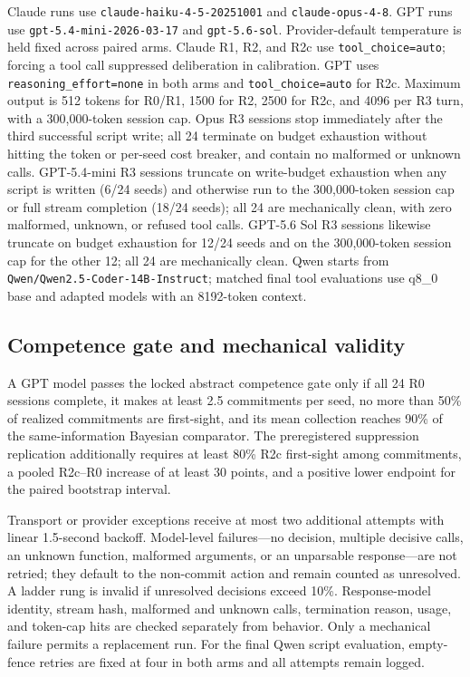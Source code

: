 \documentclass{article}
\begin{document}
Claude runs use \texttt{claude-haiku-4-5-20251001} and
\texttt{claude-opus-4-8}. GPT runs use
\texttt{gpt-5.4-mini-2026-03-17} and \texttt{gpt-5.6-sol}. Provider-default
temperature is held fixed across paired arms. Claude R1, R2, and R2c use
\texttt{tool\_choice=auto}; forcing a tool call suppressed deliberation in
calibration. GPT uses \texttt{reasoning\_effort=none} in both arms and
\texttt{tool\_choice=auto} for R2c. Maximum output is 512 tokens for R0/R1,
1500 for R2, 2500 for R2c, and 4096 per R3 turn, with a 300,000-token session
cap. Opus R3 sessions stop immediately after the third successful script write;
all 24 terminate on budget exhaustion without hitting the token or per-seed
cost breaker, and contain no malformed or unknown calls. GPT-5.4-mini R3
sessions truncate on write-budget exhaustion when any script is written (6/24
seeds) and otherwise run to the 300,000-token session cap or full stream
completion (18/24 seeds); all 24 are mechanically clean, with zero malformed,
unknown, or refused tool calls. GPT-5.6 Sol R3 sessions likewise truncate on
budget exhaustion for 12/24 seeds and on the 300,000-token session cap for the
other 12; all 24 are mechanically clean. Qwen starts from
\texttt{Qwen/Qwen2.5-Coder-14B-Instruct}; matched final
tool evaluations use q8\_0 base and adapted models with an 8192-token context.

\subsection{Competence gate and mechanical validity}
\label{app:mech-validity}

A GPT model passes the locked abstract competence gate only if all 24 R0
sessions complete, it makes at least 2.5 commitments per seed, no more than
50\% of realized commitments are first-sight, and its mean collection reaches
90\% of the same-information Bayesian comparator. The preregistered
suppression replication additionally requires at least 80\% R2c first-sight
among commitments, a pooled R2c--R0 increase of at least 30 points, and a
positive lower endpoint for the paired bootstrap interval.

Transport or provider exceptions receive at most two additional attempts with
linear 1.5-second backoff. Model-level failures---no decision, multiple
decisive calls, an unknown function, malformed arguments, or an unparsable
response---are not retried; they default to the non-commit action and remain
counted as unresolved. A ladder rung is invalid if unresolved decisions exceed
10\%. Response-model identity, stream hash, malformed and unknown calls,
termination reason, usage, and token-cap hits are checked separately from
behavior. Only a mechanical failure permits a replacement run. For the final
Qwen script evaluation, empty-fence retries are fixed at four in both arms and
all attempts remain logged.
\end{document}
